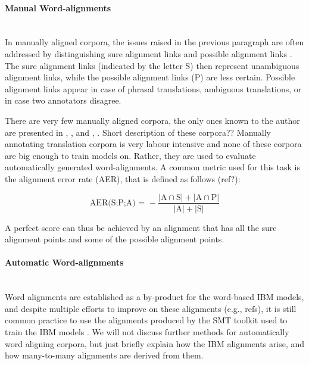 \documentclass{report}
\newcommand{\myparagraph}[1]{\paragraph{#1}\mbox{}\\}
\theoremstyle{break}
\begin{document}
\myparagraph{Manual Word-alignments}
In manually aligned corpora, the issues raised in the previous paragraph are often addressed by distinguishing sure alignment links and possible alignment links \citep{lambert2005guidelines}. The sure alignment links (indicated by the letter S) then represent unambiguous alignment links, while the possible alignment links (P) are less certain. Possible alignment links appear in case of phrasal translations, ambiguous translations, or in case two annotators disagree. 

There are very few manually aligned corpora, the only ones known to the author are presented in \cite{och2000improved}, \cite{graca2008building}, \cite{mihalcea2003evaluation} and \cite{pado2006optimal}, \cite{ahrenberg2000evaluation}. Short description of these corpora??
Manually annotating translation corpora is very labour intensive and none of these corpora are big enough to train models on. Rather, they are used to evaluate automatically generated word-alignments. A common metric used for this task is the alignment error rate (AER), that is defined as follows (ref?):

$$
\text{AER(S;P;A) = } - \frac{|\text{A}\cap\text{S}| + |\text{A}\cap\text{P}|}{|\text{A}| + |\text{S}|}
$$

A perfect score can thus be achieved by an alignment that has all the sure alignment points and some of the possible alignment points.

\myparagraph{Automatic Word-alignments}
Word alignments are established as a by-product for the word-based IBM models, and despite multiple efforts to improve on these alignments (e.g., refs), it is still common practice to use the alignments produced by the SMT toolkit used to train the IBM models \citep{och03:asc}. We will not discuss further methods for automatically word aligning corpora, but just briefly explain how the IBM alignments arise, and how many-to-many alignments are derived from them.
\end{document}

